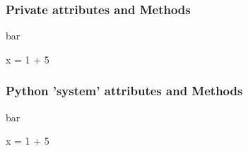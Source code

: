 \documentclass{beamer}
\begin{document}
\begin{frame}[fragile]
\frametitle{Private attributes and Methods}
bar
\begin{code}
x = 1 + 5
\end{code}
\end{frame}

\begin{frame}[fragile]
\frametitle{Python 'system' attributes and Methods}
bar
\begin{code}
x = 1 + 5
\end{code}
\end{frame}
\end{document}
